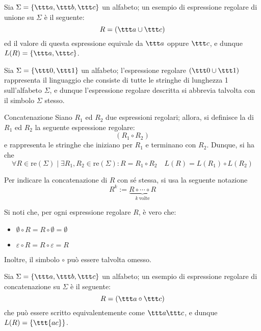 \documentclass[a4paper, 12pt]{report}
\begin{document}
    \begin{example}[Unione]
        Sia $\Sigma = \{\ttt a, \ttt b, \ttt c\}$ un alfabeto; un esempio di espressione regolare di unione su $\Sigma$ è il seguente: $$R = (\ttt a \cup \ttt c)$$ ed il valore di questa espressione equivale da $\ttt a$ oppure $\ttt c$, e dunque $L(R) = \{ \ttt a, \ttt c\}$.
    \end{example}

    \begin{example}
        Sia $\Sigma = \{\ttt 0, \ttt 1\}$ un alfabeto; l'espressione regolare $(\ttt 0 \cup \ttt 1)$ rappresenta il linguaggio che consiste di tutte le stringhe di lunghezza 1 sull'alfabeto $\Sigma$, e dunque l'espressione regolare descritta si abbrevia talvolta con il simbolo $\Sigma$ stesso.
    \end{example}

    \begin{frameddefn}{Concatenazione}
        Siano $R_1$ ed $R_2$ due espressioni regolari; allora, si definisce la  di $R_1$ ed $R_2$ la seguente espressione regolare: $$(R_1 \circ R_2)$$ e rappresenta le stringhe che iniziano per $R_1$ e terminano con $R_2$. Dunque, si ha che $$\forall R \in \mathrm{re}(\Sigma) \mid \exists R_1, R_2 \in \mathrm{re}(\Sigma) : R = R_1 \circ R_2 \quad L(R) = L(R_1) \circ L(R_2)$$

        Per indicare la concatenazione di $R$ con sé stessa, si usa la seguente notazione $$R^k := \underbrace{R \circ \cdots \circ R}_{k \ \textrm{volte}}$$

        Si noti che, per ogni espressione regolare $R$, è vero che:

        \begin{itemize}
            \item $\emptyset \circ R = R \circ \emptyset = \emptyset$
            \item $\varepsilon \circ R = R \circ \varepsilon = R$
        \end{itemize}

        Inoltre, il simbolo $\circ$ può essere talvolta omesso.
    \end{frameddefn}

    \begin{example}[Concatenazione]
        Sia $\Sigma = \{\ttt a, \ttt b, \ttt c\}$ un alfabeto; un esempio di espressione regolare di concatenazione su $\Sigma$ è il seguente: $$R = (\ttt a \circ \ttt c)$$ che può essere scritto equivalentemente come $\ttt a \ttt c$, e dunque $L(R) = \{ \ttt{ac} \}$.
    \end{example}
\end{document}
